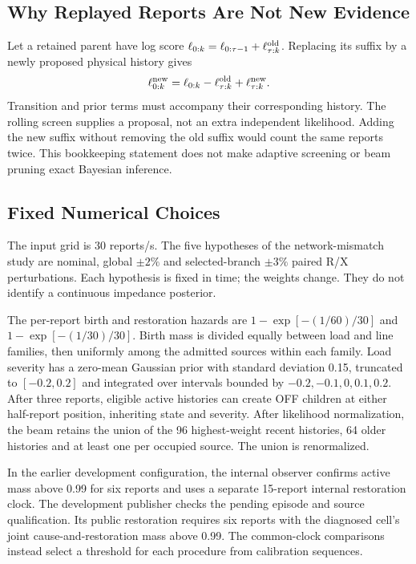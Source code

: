 \subsection{Why Replayed Reports Are Not New Evidence}

Let a retained parent have log score
$\ell_{0:k}=\ell_{0:\tau-1}+\ell^{\rm old}_{\tau:k}$.
Replacing its suffix by a newly proposed physical history gives
\begin{equation}
 \ell^{\rm new}_{0:k}
 =\ell_{0:k}-\ell^{\rm old}_{\tau:k}+\ell^{\rm new}_{\tau:k}.
 \label{eq:supp-suffix-replacement}
\end{equation}
Transition and prior terms must accompany their corresponding history.
The rolling screen supplies a proposal, not an extra independent
likelihood. Adding the new suffix without removing the old suffix would
count the same reports twice. This bookkeeping statement does not make
adaptive screening or beam pruning exact Bayesian inference.

\subsection{Fixed Numerical Choices}

The input grid is 30 reports/s. The five hypotheses of the network-mismatch
study are nominal,
global $\pm2\%$ and selected-branch $\pm3\%$ paired R/X perturbations.
Each hypothesis is fixed in time; the weights change. They do not identify
a continuous impedance posterior.

The per-report birth and restoration hazards are
$1-\exp[-(1/60)/30]$ and $1-\exp[-(1/30)/30]$.
Birth mass is divided equally between load and line families, then
uniformly among the admitted sources within each family. Load severity
has a zero-mean Gaussian prior with standard deviation 0.15, truncated to
$[-0.2,0.2]$ and integrated over intervals bounded by
$-0.2,-0.1,0,0.1,0.2$. After three reports, eligible active histories can
create OFF children at either half-report position, inheriting state and
severity. After likelihood normalization, the beam retains the union of
the 96 highest-weight recent histories, 64 older histories and at least
one per occupied source. The union is renormalized.

In the earlier development configuration, the internal observer confirms
active mass above 0.99 for six reports and uses a separate 15-report
internal restoration clock. The development publisher checks the pending
episode and source qualification. Its public restoration requires six
reports with the diagnosed cell's joint cause-and-restoration mass above
0.99. The common-clock comparisons instead select a threshold for each
procedure from calibration sequences.

